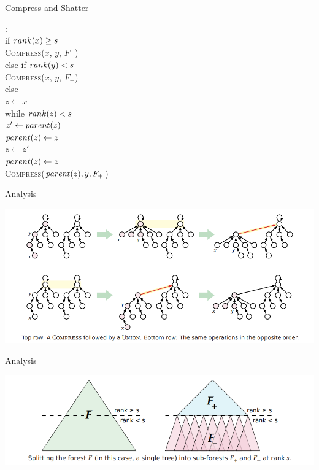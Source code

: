 \documentclass[aspectratio=169]{beamer}
\begin{document}
\begin{frame}{Compress and Shatter}
	\begin{algo}
		: \+
		\\ if $\emph{rank}(x) \ge s$ \+
		\\ \textsc{Compress}($x$, $y$, $F_+$) \-
		\\ else if $\emph{rank}(y) < s$ \+
		\\ \textsc{Compress}($x$, $y$, $F_-$) \-
		\\ else \+
		\\ $z \gets x$
		\\ while $\emph{rank}(z) < s$ \+
		\\ $z' \gets \emph{parent}(z)$
		\\ $\emph{parent}(z) \gets z$
		\\ $z \gets z'$ \-
		\\ $\emph{parent}(z) \gets z$
		\\ \textsc{Compress}($\emph{parent}(z), y, F_+$)
	\end{algo}
\end{frame}

\begin{frame}{Analysis}
	\begin{center}
		\includegraphics[width=\textwidth]{union_compress_reorder.png}
	\end{center}
\end{frame}

\begin{frame}{Analysis}
	\begin{center}
		\includegraphics[width=\textwidth]{partition_forest.png}
	\end{center}
\end{frame}
\end{document}
